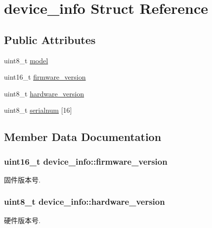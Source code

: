 \hypertarget{structdevice__info}{}\section{device\+\_\+info Struct Reference}
\label{structdevice__info}
\subsection*{Public Attributes}
\begin{DoxyCompactItemize}
\item 
uint8\+\_\+t \hyperlink{structdevice__info_a3c491b342ed11af3c70358e7e8f6c935}{model}
\item 
uint16\+\_\+t \hyperlink{structdevice__info_af3d369a410577d85ec6b59ffeeaade48}{firmware\+\_\+version}
\item 
uint8\+\_\+t \hyperlink{structdevice__info_add77e9b0edbc4a0dbd8f91b0cac9ea13}{hardware\+\_\+version}
\item 
uint8\+\_\+t \hyperlink{structdevice__info_abf23e35480aff36d846085ca6fd0eec3}{serialnum} \mbox{[}16\mbox{]}
\end{DoxyCompactItemize}


\subsection{Member Data Documentation}
\subsubsection[{\texorpdfstring{firmware\+\_\+version}{firmware_version}}]{\setlength{\rightskip}{0pt plus 5cm}uint16\+\_\+t device\+\_\+info\+::firmware\+\_\+version}\hypertarget{structdevice__info_af3d369a410577d85ec6b59ffeeaade48}{}\label{structdevice__info_af3d369a410577d85ec6b59ffeeaade48}
固件版本号. 
\subsubsection[{\texorpdfstring{hardware\+\_\+version}{hardware_version}}]{\setlength{\rightskip}{0pt plus 5cm}uint8\+\_\+t device\+\_\+info\+::hardware\+\_\+version}\hypertarget{structdevice__info_add77e9b0edbc4a0dbd8f91b0cac9ea13}{}\label{structdevice__info_add77e9b0edbc4a0dbd8f91b0cac9ea13}
硬件版本号. 
